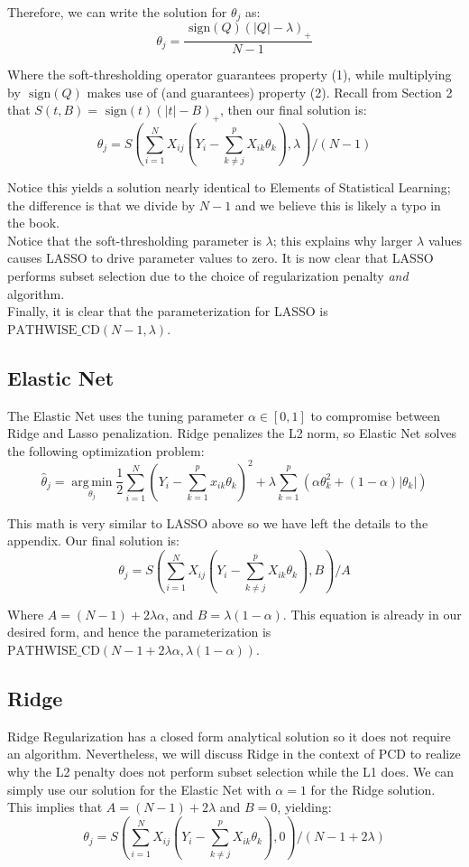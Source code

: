 \documentclass[11pt]{article}
\newcommand{\thh}{\hat{\theta}}
\newcommand{\sgn}{\text{ sign}}
\DeclareMathOperator*{\argmin}{arg\,min}
\newcommand{\pcd}{\text{PATHWISE\_CD}}
\begin{document}
Therefore, we can write the solution for $\theta_j$ as:
	$$\theta_j = \frac{\sgn(Q)(|Q|-\lambda)_+}{N-1}$$

Where the soft-thresholding operator guarantees property (1), while multiplying by $\sgn(Q)$ makes use of (and guarantees) property (2).  Recall from Section 2 that $S(t,B) = \sgn(t)(|t|-B)_+$, then our final solution is:
	$$\theta_j = S\left(\sum\limits_{i=1}^N X_{ij}(Y_i - \sum\limits_{k \ne j}^p X_{ik}\theta_k), \lambda\right)/(N-1)$$

Notice this yields a solution nearly identical to Elements of Statistical Learning\cite{ht}; the difference is that we divide by $N-1$ and we believe this is likely a typo in the book.  \\

Notice that the soft-thresholding parameter is $\lambda$; this explains why larger $\lambda$ values causes LASSO to drive parameter values to zero.  It is now clear that LASSO performs subset selection due to the choice of regularization penalty \textit{and} algorithm.  \\

Finally, it is clear that the parameterization for LASSO is $\pcd(N-1,\lambda)$.  


\subsection{Elastic Net}
The Elastic Net uses the tuning parameter $\alpha \in [0,1]$ to compromise between Ridge and Lasso penalization.  Ridge penalizes the L2 norm, so Elastic Net solves the following optimization problem:
	$$\thh_j = \argmin\limits_{\theta_j} \frac{1}{2} \sum\limits_{i=1}^N \left(Y_i - \sum\limits_{k=1}^px_{ik}\theta_k \right)^2 + \lambda \sum\limits_{k=1}^p \left(\alpha\theta_k^2 + (1-\alpha)|\theta_k| \right)$$

This math is very similar to LASSO above so we have left the details to the appendix.  Our final solution is:
	$$\theta_j = S\left(\sum\limits_{i=1}^N X_{ij}(Y_i - \sum\limits_{k \ne j}^p X_{ik}\theta_k), B\right)/A$$

Where $A=(N-1)+2\lambda\alpha$, and $B=\lambda(1-\alpha)$.  This equation is already in our desired form, and hence the parameterization is $\pcd(N-1+2\lambda\alpha,\lambda(1-\alpha))$.  

\subsection{Ridge}
Ridge Regularization has a closed form analytical solution so it does not require an algorithm.  Nevertheless, we will discuss Ridge in the context of PCD to realize why the L2 penalty does not perform subset selection while the L1 does.  We can simply use our solution for the Elastic Net with $\alpha=1$ for the Ridge solution.  This implies that $A=(N-1)+2\lambda$ and $B=0$, yielding:
	$$\theta_j = S\left(\sum\limits_{i=1}^N X_{ij}(Y_i - \sum\limits_{k \ne j}^p X_{ik}\theta_k), 0\right)/(N-1+2\lambda)$$
\end{document}
